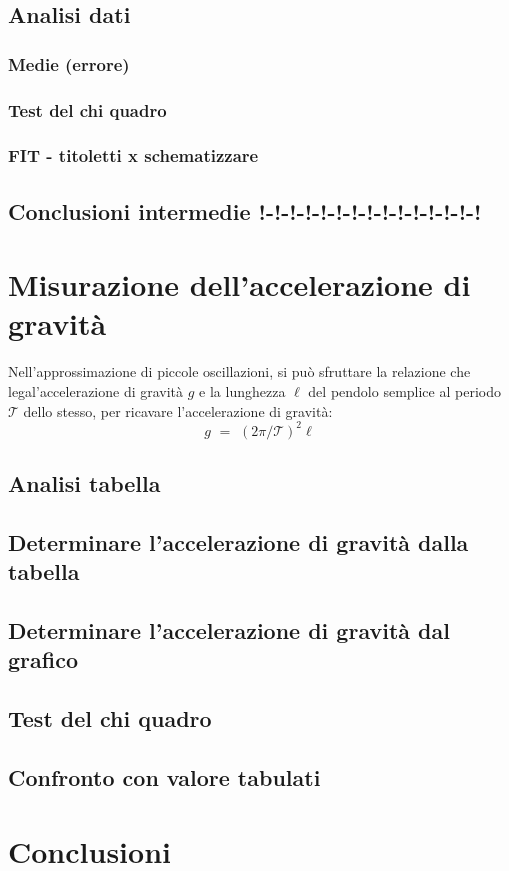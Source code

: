 \documentclass[11pt, twoside, a4paper]{article}
\begin{document}
	\subsection{Analisi dati}
		\subsubsection{Medie (errore)}
		
		\subsubsection{Test del chi quadro}
		
		\subsubsection{FIT - titoletti x schematizzare}
		
	\subsection{Conclusioni intermedie !-!-!-!-!-!-!-!-!-!-!-!-!-!-!}
	
\newpage
\section{Misurazione dell'accelerazione di gravità}
%
Nell'approssimazione di piccole oscillazioni, si può sfruttare la relazione che legal'accelerazione di gravità $g$ e la lunghezza $\ell$ del pendolo semplice al periodo $\mathcal{T}$ dello stesso, per ricavare l'accelerazione di gravità:
\begin{equation}
	g \,\, = \,\, (2 \pi / \mathcal{T})^2 \ell
\end{equation}
	\subsection{Analisi tabella}
	
	\subsection{Determinare l'accelerazione di gravità dalla tabella}
	
	\subsection{Determinare l'accelerazione di gravità dal grafico}
	
	\subsection{Test del chi quadro}
	
	\subsection{Confronto con valore tabulati}
	

\newpage
\section{Conclusioni}

\end{document}
